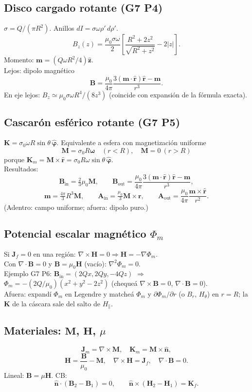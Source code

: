 \documentclass[10pt,a4paper]{article}
\newcommand{\vect}[1]{\mathbf{#1}}
\newcommand{\uv}[1]{\hat{\mathbf{#1}}}
\newcommand{\muo}{\mu_0}
\begin{document}
\subsection{Disco cargado rotante (G7 P4)}
$\sigma=Q/(\pi R^2)$. Anillos $dI=\sigma\omega\rho'\,d\rho'$.
\[
B_z(z)=\frac{\muo\sigma\omega}{2}\!\left[\frac{R^2+2z^2}{\sqrt{R^2+z^2}}-2|z|\right].
\]
Momento: $\vect{m}=(Q\omega R^2/4)\uv{z}$.\\
Lejos: dipolo magnético
\[
\vect{B}=\frac{\muo}{4\pi}\frac{3(\vect{m}\cdot\uv{r})\uv{r}-\vect{m}}{r^3}.
\]
En eje lejos: $B_z\simeq\muo\sigma\omega R^4/(8z^3)$ (coincide con expansión de la fórmula exacta).

\subsection{Cascarón esférico rotante (G7 P5)}
$\vect{K}=\sigma_0\omega R\sin\theta\,\uv{\varphi}$. Equivalente a esfera con magnetización uniforme
\[
\vect{M}=\sigma_0 R\boldsymbol{\omega}\quad(r<R),\quad \vect{M}=0\ (r>R)
\]
porque $\vect{K}_m=\vect{M}\times\uv{r}=\sigma_0 R\omega\sin\theta\,\uv{\varphi}$.\\
Resultados:
\[
\vect{B}_{\mathrm{in}}=\tfrac23\muo\vect{M},\qquad
\vect{B}_{\mathrm{out}}=\frac{\muo}{4\pi}\frac{3(\vect{m}\cdot\uv{r})\uv{r}-\vect{m}}{r^3},
\]
\[
\vect{m}=\tfrac{4\pi}{3}R^3\vect{M},\qquad
\vect{A}_{\mathrm{in}}=\tfrac{\muo}{3}\vect{M}\times\vect{r},\qquad
\vect{A}_{\mathrm{out}}=\frac{\muo}{4\pi}\frac{\vect{m}\times\uv{r}}{r^2}.
\]
(Adentro: campo uniforme; afuera: dipolo puro.)

\subsection{Potencial escalar magnético $\Phi_m$}
Si $\vect{J}_f=0$ en una región: $\nabla\times\vect{H}=0\Rightarrow\vect{H}=-\nabla\Phi_m$.\\
Con $\nabla\cdot\vect{B}=0$ y $\vect{B}=\muo\vect{H}$ (vacío): $\nabla^2\Phi_m=0$.\\
Ejemplo G7 P6: $\vect{B}_{\mathrm{in}}=(2Qx,2Qy,-4Qz)$ $\Rightarrow$ $\Phi_m=-(2Q/\muo)(x^2+y^2-2z^2)$ (chequeá $\nabla\times\vect{B}=0$, $\nabla\cdot\vect{B}=0$).\\
Afuera: expandí $\Phi_m$ en Legendre y matcheá $\Phi_m$ y $\partial\Phi_m/\partial r$ (o $B_r$, $H_\theta$) en $r=R$; la $\vect{K}$ de la cáscara sale del salto de $H_\parallel$.

\subsection{Materiales: $\vect{M}$, $\vect{H}$, $\mu$}
\[
\vect{J}_m=\nabla\times\vect{M},\quad\vect{K}_m=\vect{M}\times\uv{n},
\]
\[
\vect{H}=\frac{\vect{B}}{\muo}-\vect{M},\quad\nabla\times\vect{H}=\vect{J}_f,\quad\nabla\cdot\vect{B}=0.
\]
Lineal: $\vect{B}=\mu\vect{H}$. CB:
\[
\uv{n}\cdot(\vect{B}_2-\vect{B}_1)=0,\qquad
\uv{n}\times(\vect{H}_2-\vect{H}_1)=\vect{K}_f.
\]
\end{document}
